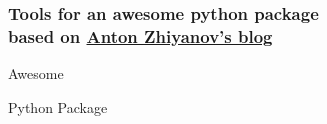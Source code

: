 \begin{frame}
    \frametitle{Tools for an awesome python package \\
        {\tiny based on \href{https://antonz.org/python-packaging/}
        {Anton Zhiyanov's blog}}
    }

    \begin{multicols}{2}
        \begin{center}
            {\huge Awesome}
        \end{center}
        
        \columnbreak
        {\huge Python Package}
    \end{multicols}

\end{frame}
